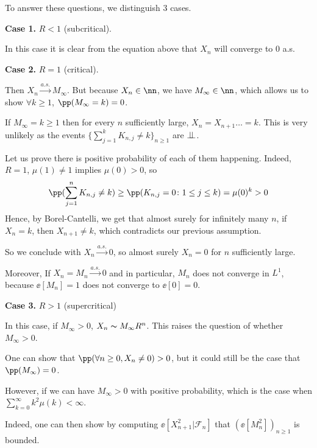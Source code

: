 \documentclass[../main.tex]{subfiles}
\begin{document}
  To answer these questions, we distinguish $3$ cases.

  \vspace{0.4em} \noindent
  \textbf{\sffamily Case 1.} $R < 1$ (subcritical). 
  
  \noindent
  In this case it is clear
  from the equation above that $X_n$ will converge to $0$ a.s.

  \vspace{0.4em} \noindent
  \textbf{\sffamily Case 2.}
  $R = 1$ (critical).

  \noindent
  Then $X_n \overset{a.s.}{\longrightarrow} M_{\infty}$. But because $X_n \in
  \nn$, we have $M_{\infty} \in \nn$, which allows us to show $\forall k \geq 1$,
  $\pp(M_{\infty} = k) = 0$.
  
  If $M_{\infty} = k \geq 1$ then for every $n$ sufficiently large, $X_n =
  X_{n+1} \ldots = k$. This is very unlikely as the events $\{ \sum_{j=1}^k
  K_{n,j} \neq k \}_{n \geq 1} $ are $\perp\!\!\!\!\,\perp$. 

  Let us prove there is positive probability of each of them happening. Indeed,
  $R = 1$, $\mu(1) \neq 1$ implies $\mu(0) > 0$, so 
  $$\pp(\sum_{j=1}^n K_{n, j} \neq k) \geq \pp(K_{n,j} = 0 \colon 1 \leq j \leq
  k) = \mu(0)^{k} > 0$$
  Hence, by Borel-Cantelli, we get that almost surely for infinitely many $n$,
  if $X_n = k$, then $X_{n+1} \neq k$, which contradicts our previous
  assumption.

  So we conclude with $X_n \overset{a.s.}{\longrightarrow} 0 $, 
  so almost surely $X_n = 0$ for
  $n$ sufficiently large.

  Moreover, If $X_n = M_n \overset{a.s.}{\longrightarrow} 0$ and in particular, 
  $M_n$ does not converge in $L^1$, because $\ee[M_n] = 1$ does not converge to
  $\ee[0]=0$.

  \vspace{0.4em} \noindent
  \textbf{\sffamily Case 3.}
  $R > 1$ (supercritical)
  
  \noindent
  In this case, if $M_{\infty} > 0$, $X_n \thicksim M_{\infty} R^n$. This raises
  the question of whether $M_{\infty} > 0$.

  One can show that $\pp(\forall n \geq 0, X_n \neq 0) > 0$, but it could still
  be the case that $\pp(M_{\infty}) = 0$.

  However, if we can have $M_{\infty} > 0$ with positive probability, 
  which is the case when
  $\sum_{k=0}^\infty k^2 \mu(k) < \infty$. 

  Indeed, one can then show by computing $\ee[X_{n+1}^2 | \mathcal{F}_n]$ that
  $(\ee[M_n^2])_{n \geq 1}$ is bounded.
\end{document}
